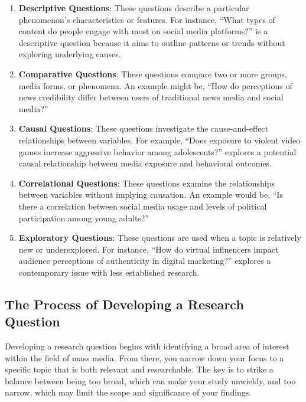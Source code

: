 \documentclass[
]{book}
\begin{document}
\begin{enumerate}
\def\labelenumi{\arabic{enumi}.}
\item
  \textbf{Descriptive Questions}: These questions describe a particular phenomenon's characteristics or features. For instance, ``What types of content do people engage with most on social media platforms?'' is a descriptive question because it aims to outline patterns or trends without exploring underlying causes.
\item
  \textbf{Comparative Questions}: These questions compare two or more groups, media forms, or phenomena. An example might be, ``How do perceptions of news credibility differ between users of traditional news media and social media?''
\item
  \textbf{Causal Questions}: These questions investigate the cause-and-effect relationships between variables. For example, ``Does exposure to violent video games increase aggressive behavior among adolescents?'' explores a potential causal relationship between media exposure and behavioral outcomes.
\item
  \textbf{Correlational Questions}: These questions examine the relationships between variables without implying causation. An example would be, ``Is there a correlation between social media usage and levels of political participation among young adults?''
\item
  \textbf{Exploratory Questions}: These questions are used when a topic is relatively new or underexplored. For instance, ``How do virtual influencers impact audience perceptions of authenticity in digital marketing?'' explores a contemporary issue with less established research.
\end{enumerate}

\subsection*{The Process of Developing a Research Question}\label{the-process-of-developing-a-research-question}

Developing a research question begins with identifying a broad area of interest within the field of mass media. From there, you narrow down your focus to a specific topic that is both relevant and researchable. The key is to strike a balance between being too broad, which can make your study unwieldy, and too narrow, which may limit the scope and significance of your findings.
\end{document}
